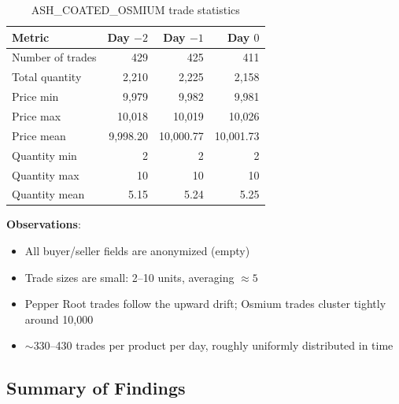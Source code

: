 \documentclass[11pt,a4paper]{article}
\begin{document}
\begin{table}[H]
\centering
\caption{ASH\_COATED\_OSMIUM trade statistics}
\begin{tabular}{@{}lrrr@{}}
\toprule
\textbf{Metric} & \textbf{Day $-2$} & \textbf{Day $-1$} & \textbf{Day $0$} \\
\midrule
Number of trades    & 429         & 425         & 411 \\
Total quantity      & 2,210       & 2,225       & 2,158 \\
Price min           & 9,979       & 9,982       & 9,981 \\
Price max           & 10,018      & 10,019      & 10,026 \\
Price mean          & 9,998.20    & 10,000.77   & 10,001.73 \\
Quantity min        & 2           & 2           & 2 \\
Quantity max        & 10          & 10          & 10 \\
Quantity mean       & 5.15        & 5.24        & 5.25 \\
\bottomrule
\end{tabular}
\end{table}

\textbf{Observations}:
\begin{itemize}
    \item All buyer/seller fields are anonymized (empty)
    \item Trade sizes are small: 2--10 units, averaging $\approx 5$
    \item Pepper Root trades follow the upward drift; Osmium trades cluster tightly around 10,000
    \item $\sim$330--430 trades per product per day, roughly uniformly distributed in time
\end{itemize}

\subsection{Summary of Findings}
\end{document}

